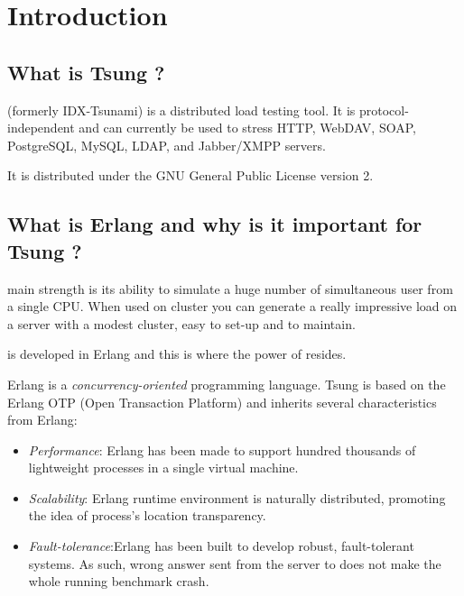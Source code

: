 \documentclass{IDXDOC-en}
\begin{document}
\maketitle
\newpage
\tableofcontents

\section{Introduction}

\subsection{What is Tsung ?}

 (formerly IDX-Tsunami) is a distributed load testing tool. It is
protocol-independent and can currently be used to stress HTTP, WebDAV, SOAP,
PostgreSQL, MySQL, LDAP, and Jabber/XMPP servers.

It is distributed under the GNU General Public License version 2.


\subsection{What is Erlang and why is it important for Tsung ?}

 main strength is its ability to simulate a huge number of
simultaneous user from a single CPU. When used on cluster you can
generate a really impressive load on a server with a modest cluster,
easy to set-up and to maintain.

 is developed in Erlang and this is where the power
of  resides.

\par Erlang is a \emph{concurrency-oriented} programming language.
Tsung is based on the Erlang OTP (Open Transaction Platform) and
inherits several characteristics from Erlang:

\begin{itemize}
\item \emph{Performance}: Erlang has been made to support hundred thousands
of lightweight processes in a single virtual machine.
\item \emph{Scalability}: Erlang runtime environment is naturally
distributed, promoting the idea of process's location transparency.
\item \emph{Fault-tolerance}:Erlang has been built to develop robust,
fault-tolerant systems. As such, wrong answer sent from the server
to  does not make the whole running benchmark crash.
\end{itemize}
\end{document}
